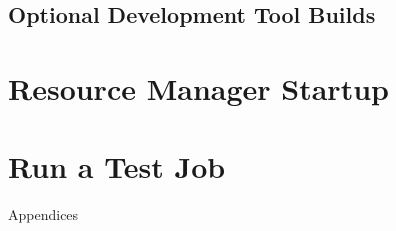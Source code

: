 \documentclass[letterpaper]{article}
\begin{document}
\subsection{Optional Development Tool Builds} \label{sec:3rdparty_intel}


\clearpage
\section{Resource Manager Startup} \label{sec:rms_startup}


\section{Run a Test Job} \label{sec:test_job}


\clearpage
\appendix
{\bf \LARGE \centerline{Appendices}} \vspace*{0.2cm}

\renewcommand{\thesubsection}{\Alph{subsection}}







\end{document}
